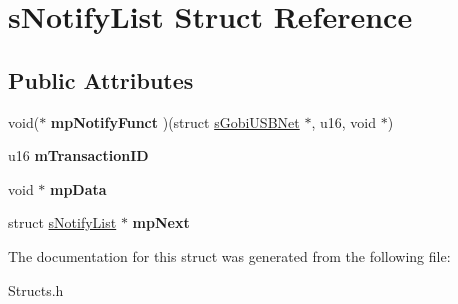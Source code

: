 \hypertarget{structsNotifyList}{\section{s\-Notify\-List \-Struct \-Reference}
\label{structsNotifyList}
}
\subsection*{\-Public \-Attributes}
\begin{DoxyCompactItemize}
\item 
\hypertarget{structsNotifyList_a57da18a8d8ef3fac2ccc2de0c03c6fbf}{void($\ast$ {\bfseries mp\-Notify\-Funct} )(struct \hyperlink{structsGobiUSBNet}{s\-Gobi\-U\-S\-B\-Net} $\ast$, u16, void $\ast$)}\label{structsNotifyList_a57da18a8d8ef3fac2ccc2de0c03c6fbf}

\item 
\hypertarget{structsNotifyList_aa506a06067d575750311f1836032638f}{u16 {\bfseries m\-Transaction\-I\-D}}\label{structsNotifyList_aa506a06067d575750311f1836032638f}

\item 
\hypertarget{structsNotifyList_ac5ea54dacde4f0f23bd34dee52e1c0a8}{void $\ast$ {\bfseries mp\-Data}}\label{structsNotifyList_ac5ea54dacde4f0f23bd34dee52e1c0a8}

\item 
\hypertarget{structsNotifyList_a14f75e05b02077b54a294e2e8f1f2ef3}{struct \hyperlink{structsNotifyList}{s\-Notify\-List} $\ast$ {\bfseries mp\-Next}}\label{structsNotifyList_a14f75e05b02077b54a294e2e8f1f2ef3}

\end{DoxyCompactItemize}


\-The documentation for this struct was generated from the following file\-:\begin{DoxyCompactItemize}
\item 
\-Structs.\-h\end{DoxyCompactItemize}
